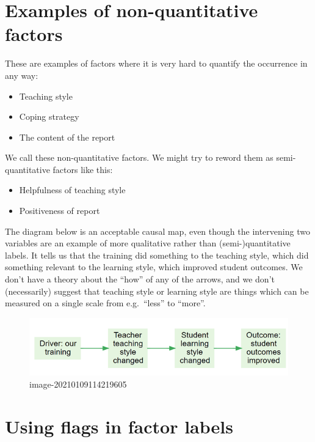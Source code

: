 \documentclass[
]{book}
\begin{document}
\hypertarget{examples-of-non-quantitative-factors}{%
\section{Examples of non-quantitative factors}\label{examples-of-non-quantitative-factors}}

These are examples of factors where it is very hard to quantify the occurrence in any way:

\begin{itemize}
\item
  Teaching style
\item
  Coping strategy
\item
  The content of the report
\end{itemize}

We call these non-quantitative factors. We might try to reword them as semi-quantitative factors like this:

\begin{itemize}
\item
  Helpfulness of teaching style
\item
  Positiveness of report
\end{itemize}

The diagram below is an acceptable causal map, even though the intervening two variables are an example of more qualitative rather than (semi-)quantitative labels. It tells us that the training did something to the teaching style, which did something relevant to the learning style, which improved student outcomes. We don't have a theory about the ``how'' of any of the arrows, and we don't (necessarily) suggest that teaching style or learning style are things which can be measured on a single scale from e.g.~``less'' to ``more''.

\begin{figure}
\centering
\includegraphics{_assets/image-20210109114219605.png}
\caption{image-20210109114219605}
\end{figure}

\hypertarget{using-flags-in-factor-labels}{%
\section{Using flags in factor labels}\label{using-flags-in-factor-labels}}
\end{document}
